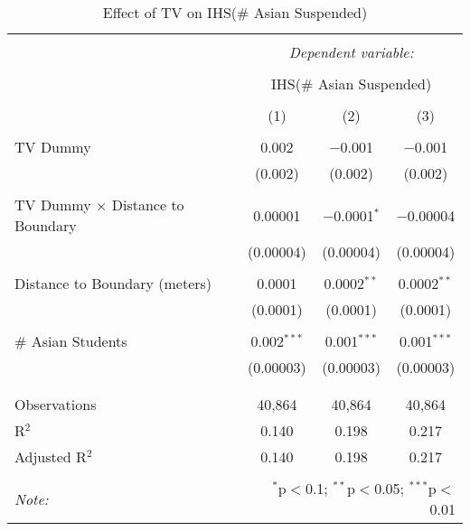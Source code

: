 
\begin{table}[!htbp] \centering 
  \caption{Effect of TV on IHS(\# Asian Suspended)} 
  \label{} 
\begin{tabular}{@{\extracolsep{-2pt}}lccc} 
\\[-1.8ex]\hline 
\hline \\[-1.8ex] 
 & \multicolumn{3}{c}{\textit{Dependent variable:}} \\ 
\cline{2-4} 
\\[-1.8ex] & \multicolumn{3}{c}{IHS(\# Asian Suspended)} \\ 
\\[-1.8ex] & (1) & (2) & (3)\\ 
\hline \\[-1.8ex] 
 TV Dummy & 0.002 & $-$0.001 & $-$0.001 \\ 
  & (0.002) & (0.002) & (0.002) \\ 
  & & & \\ 
 TV Dummy $\times$ Distance to Boundary & 0.00001 & $-$0.0001$^{*}$ & $-$0.00004 \\ 
  & (0.00004) & (0.00004) & (0.00004) \\ 
  & & & \\ 
 Distance to Boundary (meters) & 0.0001 & 0.0002$^{**}$ & 0.0002$^{**}$ \\ 
  & (0.0001) & (0.0001) & (0.0001) \\ 
  & & & \\ 
 \# Asian Students & 0.002$^{***}$ & 0.001$^{***}$ & 0.001$^{***}$ \\ 
  & (0.00003) & (0.00003) & (0.00003) \\ 
  & & & \\ 
\hline \\[-1.8ex] 
Observations & 40,864 & 40,864 & 40,864 \\ 
R$^{2}$ & 0.140 & 0.198 & 0.217 \\ 
Adjusted R$^{2}$ & 0.140 & 0.198 & 0.217 \\ 
\hline 
\hline \\[-1.8ex] 
\textit{Note:}  & \multicolumn{3}{r}{$^{*}$p$<$0.1; $^{**}$p$<$0.05; $^{***}$p$<$0.01} \\ 
\end{tabular} 
\end{table} 
